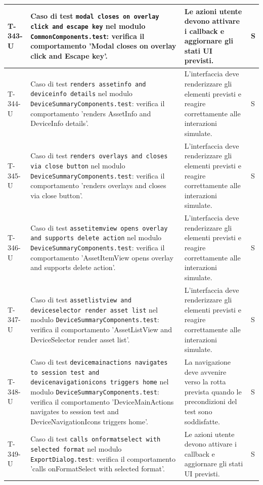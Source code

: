 \documentclass[a4paper,12pt]{article}
\begin{document}
{{\begin{longtable}{|>{\RaggedRight\arraybackslash}p{1.55cm}|>{\RaggedRight\arraybackslash}p{8.0cm}|>{\RaggedRight\arraybackslash}p{4.6cm}|>{\RaggedRight\arraybackslash}p{1.2cm}|}
        \hline
        T-343-U & Caso di test \texttt{modal closes on overlay click and escape key} nel modulo \texttt{CommonComponents.test}: verifica il comportamento 'Modal closes on overlay click and Escape key'. & Le azioni utente devono attivare i callback e aggiornare gli stati UI previsti. & S \\
        \hline
        T-344-U & Caso di test \texttt{renders assetinfo and deviceinfo details} nel modulo \texttt{DeviceSummaryComponents.test}: verifica il comportamento 'renders AssetInfo and DeviceInfo details'. & L'interfaccia deve renderizzare gli elementi previsti e reagire correttamente alle interazioni simulate. & S \\
        \hline
        T-345-U & Caso di test \texttt{renders overlays and closes via close button} nel modulo \texttt{DeviceSummaryComponents.test}: verifica il comportamento 'renders overlays and closes via close button'. & L'interfaccia deve renderizzare gli elementi previsti e reagire correttamente alle interazioni simulate. & S \\
        \hline
        T-346-U & Caso di test \texttt{assetitemview opens overlay and supports delete action} nel modulo \texttt{DeviceSummaryComponents.test}: verifica il comportamento 'AssetItemView opens overlay and supports delete action'. & L'interfaccia deve renderizzare gli elementi previsti e reagire correttamente alle interazioni simulate. & S \\
        \hline
        T-347-U & Caso di test \texttt{assetlistview and deviceselector render asset list} nel modulo \texttt{DeviceSummaryComponents.test}: verifica il comportamento 'AssetListView and DeviceSelector render asset list'. & L'interfaccia deve renderizzare gli elementi previsti e reagire correttamente alle interazioni simulate. & S \\
        \hline
        T-348-U & Caso di test \texttt{devicemainactions navigates to session test and devicenavigationicons triggers home} nel modulo \texttt{DeviceSummaryComponents.test}: verifica il comportamento 'DeviceMainActions navigates to session test and DeviceNavigationIcons triggers home'. & La navigazione deve avvenire verso la rotta prevista quando le precondizioni del test sono soddisfatte. & S \\
        \hline
        T-349-U & Caso di test \texttt{calls onformatselect with selected format} nel modulo \texttt{ExportDialog.test}: verifica il comportamento 'calls onFormatSelect with selected format'. & Le azioni utente devono attivare i callback e aggiornare gli stati UI previsti. & S \\

\end{longtable}}}
\end{document}
